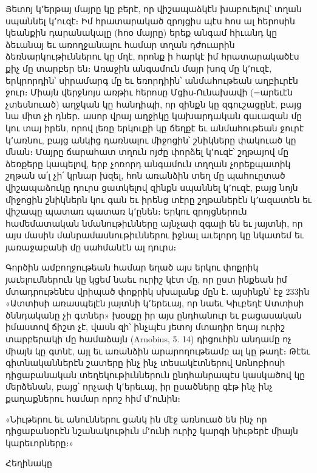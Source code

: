 \documentclass{article}
\begin{document}
{Յետոյ կ՚երթայ մայրը կը բերէ, որ վիշապաձկէն խաբուելով՝ տղան սպաննել կ՚ուզէ։ Իմ հրատարակած զրոյցիս պէս հոս ալ հերոսին կեանքին դարանակալը (հոօ մայրը) երեք անգամ հիւանդ կը ձեւանայ եւ առողջանալու համար տղան դժուարին ձեռնարկութիւններու կը մղէ, որոնք ի հարկէ իմ հրատարակածէս քիչ մը տարբեր են։ Առաջին անգամուն մայր խոզ մը կ՚ուզէ, երկրորդին՝ սիրամարգ մը եւ եռորդիին՝ անմահութեան աղբիւրէն ջուր։ Միայն վերջնոյս առթիւ հերոսը Մցիս-Ունախավի (=արեւէն չտեսնուած) աղջկան կը հանդիպի, որ զինքն կը զգուշացընէ, բայց նա միտ չի դներ․ ասոր վրայ աղջիկը կախարդական գաւազան մը կու տայ իրեն, որով լեռը երկուքի կը ճեղքէ եւ անմահութեան ջուրէ կ՚առնու, բայց անկից դառնալու միջոցին՝ շնիկները փակուած կը մնան։ Մայրը ճարահատ տղուն ոյժը փորձել կ՚ուզէ՝ շղթայով մը ձեռքերը կապելով, երբ չոռորդ անգամուն տղղան չորեքպատիկ շղթան ա՛լ չի՛ կրնար խզել, հոն առանձին տեղ մը պահուըտած վիշապաձուկը դուրս ցատկելով զինքն սպաննել կ՚ուզէ, բայց նոյն միջոցին շնիկներն կու գան եւ իրենց տէրը շղթաներէն կ՚ազատեն եւ վիշապը պատառ պատառ կ՚ընեն։ Երկու զրոյցներուն համեմատական նմանութիւնները այնչափ զգալի են եւ յայտնի, որ այս մասին մանրամասնութիւններու իջնալ աւելորդ կը նկատեմ եւ յառաջաբանի մը սահմանէն ալ դուրս։

Գործին ամբողջութեան համար եղած այս երկու փոքրիկ յաւելումներուն կը կցեմ նաեւ ուրիշ կէտ մը, որ ըստ ինքեան իմ մտադրութենէս վրիպած փոքրիկ սխալանք մըն է․ այսինքն՝ էջ 233ին «Ատտիսի առասպելէն յայտնի կ՚երեւայ, որ նաեւ Կիւբեղէ Ատտիսի ծննդականը չի գտներ» խօսքը իր այս ընդհանուր եւ բացասական իմաստով ճիշտ չէ, վասն զի՝ ինչպէս յետոյ մտադիր եղայ ուրիշ տարբերակի մը համաձայն (Arnobius, 5. 14) դիցուհին անդամը ոչ միայն կը գտնէ, այլ եւ առանձին արարողութեամբ ալ կը թաղէ։ Թէեւ գիտնականներէն շատերը ինչ ինչ տեսակէտներով Առնոբիոսի դիցաբանական տեղեկութիւններուն ընդհանրապէս կասկածով կը մերձենան, բայց՝ որչափ կ՚երեւայ, իր ըսածները գէթ ինչ ինչ քաղաքներու համար որոշ հիմ մ՚ունին։

«Նիւթերու եւ անուններու ցանկ ին մէջ առնուած են ինչ որ դիցաբանօրէն նշանակութիւն մ՚ունի ուրիշ կարգի նիւթերէ միայն կարեւորները։»

\bigskip

Հեղինակը
}
\clearpage
\section*{}
\end{document}

